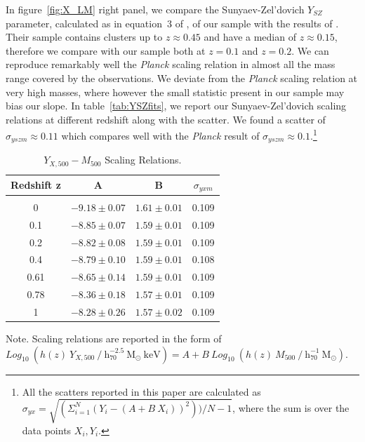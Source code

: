 \documentclass[traditabstract]{aa}
\newcommand{\rmn}{\mathrm}
\begin{document}
In figure~\ref{fig:X_LM} right panel, we compare the Sunyaev-Zel'dovich $Y_{SZ}$ parameter, calculated as in equation~3 of \cite{2011arXiv1109.3709B}, of our sample with the results of \cite{2011A&A...536A..11P}. Their sample contains clusters up to $z \approx 0.45$ and have a median of $z \approx 0.15$, therefore we compare with our sample both at $z=0.1$ and $z=0.2$. We can reproduce remarkably well the \emph{Planck} scaling relation in almost all the mass range covered by the observations. We deviate from the \emph{Planck} scaling relation at very high masses, where however the small statistic present in our sample may bias our slope. In table~\ref{tab:YSZfits}, we report our Sunyaev-Zel'dovich scaling relations at different redshift along with the scatter. We found a scatter of $\sigma_{yszm} \approx 0.11$ which compares well with the \emph{Planck} result of $\sigma_{yszm} \approx 0.1$.\footnote[8]{All the scatters reported in this paper are calculated as $\sigma_{yx} = \sqrt{ ( \Sigma_{i=1}^{N} (Y_{i}-(A+B~X_{i}))^{2}) ) /N-1}$, where the sum is over the data points $X_{i}, Y_{i}$.}
 
\begin{table}[hbt!]
\begin{center}
\caption{$Y_{X, 500}-M_{500}$ Scaling Relations.}
\medskip
\begin{tabular}{cccc}
\hline
\phantom{\Big|}
Redshift z & A & B & $\sigma_{yxm}$ \\
\hline\\[-0.5em]
 0      & $-9.18\pm0.07$ & $1.61\pm0.01$ & 0.109\\
 0.1   & $-8.85\pm0.07$ & $1.59\pm0.01$ & 0.109\\
 0.2   & $-8.82\pm0.08$ & $1.59\pm0.01$ & 0.109\\ 
 0.4   & $-8.79\pm0.10$ & $1.59\pm0.01$ & 0.108\\ 
 0.61 & $-8.65\pm0.14$ & $1.59\pm0.01$ & 0.109\\ 
 0.78 & $-8.36\pm0.18$ & $1.57\pm0.01$ & 0.109\\ 
 1      & $-8.28\pm0.26$ & $1.57\pm0.02$ & 0.109\\[0.5em]  
\hline
\end{tabular}
\label{tab:YXfits}
\end{center}
\footnotesize{Note. Scaling relations are reported in the form of $Log_{10}~(h(z)~Y_{X,500}~/~\rmn{h}_{70}^{-2.5}~\rmn{M_{\odot}}~\rmn{keV})=A+B~Log_{10}~(h(z)~M_{500}~/~\rmn{h}_{70}^{-1}~\rmn{M_{\odot}})$. }
\end{table}
\end{document}

